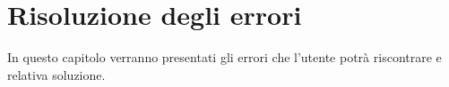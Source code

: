 \chapter{Risoluzione degli errori}
In questo capitolo verranno presentati gli errori che l'utente potrà riscontrare e relativa soluzione.